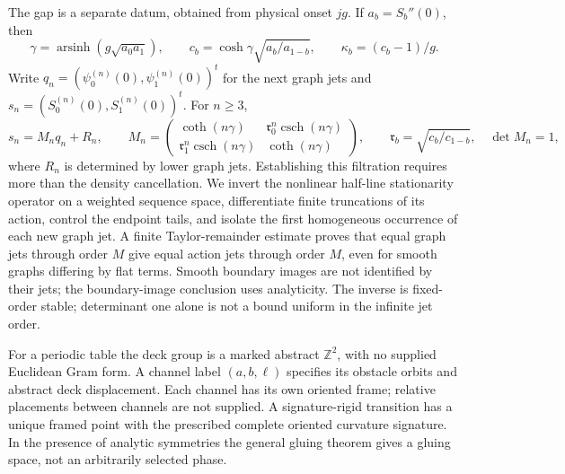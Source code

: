 The gap is a separate datum, obtained from physical onset \(jg\).  If
\(a_b=S_b''(0)\), then
\[
 \gamma=\operatorname{arsinh}(g\sqrt{a_0a_1}),\qquad
 c_b=\cosh\gamma\sqrt{a_b/a_{1-b}},\qquad
 \kappa_b=(c_b-1)/g.
\]
Write \(q_n=(\psi_0^{(n)}(0),\psi_1^{(n)}(0))^t\) for the next graph
jets and \(s_n=(S_0^{(n)}(0),S_1^{(n)}(0))^t\).  For \(n\ge3\),
\begin{equation}\label{eq:v25-intro-jet-block}
 s_n=M_nq_n+R_n,\qquad
 M_n=\begin{pmatrix}
 \coth(n\gamma)&\mathfrak r_0^n\operatorname{csch}(n\gamma)\\
 \mathfrak r_1^n\operatorname{csch}(n\gamma)&\coth(n\gamma)
 \end{pmatrix},\qquad
 \mathfrak r_b=\sqrt{c_b/c_{1-b}},\quad\det M_n=1,
\end{equation}
where \(R_n\) is determined by lower graph jets.  Establishing this
filtration requires more than the density cancellation.  We invert the
nonlinear half-line stationarity operator on a weighted sequence space,
differentiate finite truncations of its action, control the endpoint tails,
and isolate the first homogeneous occurrence of each new graph jet.
A finite Taylor-remainder estimate proves that equal graph jets through
order \(M\) give equal action jets through order \(M\), even for
smooth graphs differing by flat terms.  Smooth boundary images are not
identified by their jets; the boundary-image conclusion uses analyticity.
The inverse is fixed-order stable; determinant one alone is not a bound
uniform in the infinite jet order.

For a periodic table the deck group is a marked abstract \(\mathbb Z^2\),
with no supplied Euclidean Gram form.  A channel label \((a,b,\ell)\)
specifies its obstacle orbits and abstract deck displacement.  Each channel
has its own oriented frame; relative placements between channels are not
supplied.  A signature-rigid transition has a unique framed point with the
prescribed complete oriented curvature signature.  In the presence of
analytic symmetries the general gluing theorem gives a gluing space, not
an arbitrarily selected phase.

